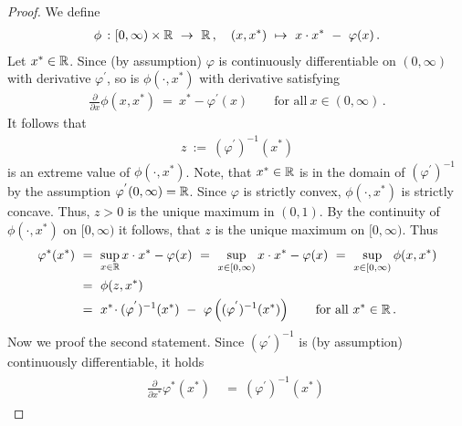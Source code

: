 \begin{proof}
We define
\begin{gather*}
 \phi
 \ 
 \colon
 [0,\infty)
 \times
 \R
 \ 
 \to
 \ 
 \R
 \,,
 \quad
 (x,x^*)
 \ 
 \mapsto
 \ 
 x\cdot x^*
 \ 
 -
 \ 
 \varphi(x)
 \,.
\end{gather*}
Let $x^*\in\mathbb{R}$.
Since
(by assumption)
      $\varphi$ is continuously differentiable on $(0,\infty)$ with derivative $\varphi^{'}$,
      so is $\phi(\cdot,x^*)$ with derivative
      satisfying 
      \begin{gather*}
        \frac{\partial}{\partial x}
        \phi(x,x^*)
        \ 
        =
 \ 
        x^*
        -
        \varphi^{'}(x)
        \qquad
        \text{for all}\ 
        x\in(0,\infty)
        \,.
      \end{gather*}
  It follows that 
  \begin{gather*}
    z
    \ 
    :=
    \ 
      (
    \varphi^{'}
    )^{-1}
    (x^*)
  \end{gather*}
  is an extreme value of $\phi(\cdot,x^*)$.
  Note, that $x^*\in\mathbb{R}$ is in the domain of 
  $
      (
    \varphi^{'}
    )^{-1}
  $
  by the assumption $\varphi^{'}(0,\infty)=\mathbb{R}$.
  Since $\varphi$ is strictly convex, $\phi(\cdot,x^*)$ is strictly concave. 
  Thus,
  $z>0$ is the unique maximum in $(0,1)$.
  By the continuity of $\phi(\cdot,x^*)$ on $[0,\infty)$ it follows, that $z$ is the unique maximum on $[0,\infty)$.
  Thus
  \begin{align*}
    \varphi^*(x^*)
    &
    \ 
    =
    \ 
    \sup_{x\in\R}
    x\cdot x^* - \varphi(x)
    \ 
    =
    \ 
    \sup_{x\in [0,\infty)}
    x\cdot x^* - \varphi(x)
    \ 
    =
    \ 
    \sup_{x\in [0,\infty)}
    \phi(x,x^*)
    \\
    &
    \ 
    =
    \ 
    \phi(z,x^*)
    \\
    &
    \ 
    =
    \ 
    x^*
    \!
    \cdot
    (
    \varphi^{'}
    )^{-1}
    (x^*)
    \ 
    -
    \ 
    \varphi
    \left( 
      (
    \varphi^{'}
    )^{-1}
    (x^*)
    \right)
    \qquad 
    \text{for all}\ 
    x^*\in\R
    \,.
  \end{align*}
  Now we proof the second statement.
  Since
  $
      (
    \varphi^{'}
    )^{-1}
  $
  is (by assumption) continuously differentiable, it holds
  \begin{align}
    \label{0098}
    \begin{split}
    \frac{\partial}{\partial x^*}
     \varphi^*(x^*)
    &
    \ 
    =
    \ 
    (
    \varphi^{'}
    )^{-1}
    (x^*)
    \ 

\end{split}
\end{align}
\end{proof}
